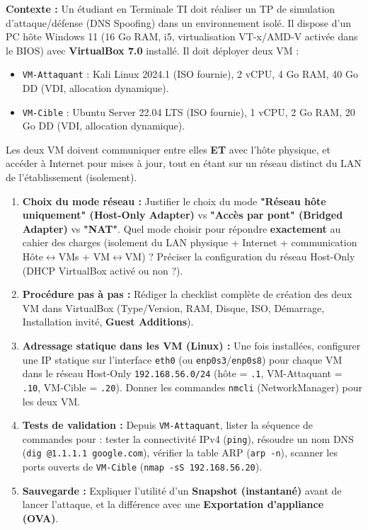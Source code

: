 \documentclass[11pt]{article}
\begin{document}
\begin{exoresolu}
\textbf{Contexte :} Un étudiant en Terminale TI doit réaliser un TP de simulation d'attaque/défense (DNS Spoofing) dans un environnement isolé. Il dispose d'un PC hôte Windows 11 (16 Go RAM, i5, virtualisation VT-x/AMD-V activée dans le BIOS) avec \textbf{VirtualBox 7.0} installé. Il doit déployer deux VM :
\begin{itemize}
    \item \texttt{VM-Attaquant} : Kali Linux 2024.1 (ISO fournie), 2 vCPU, 4 Go RAM, 40 Go DD (VDI, allocation dynamique).
    \item \texttt{VM-Cible} : Ubuntu Server 22.04 LTS (ISO fournie), 1 vCPU, 2 Go RAM, 20 Go DD (VDI, allocation dynamique).
\end{itemize}
Les deux VM doivent communiquer entre elles \textbf{ET} avec l'hôte physique, et accéder à Internet pour mises à jour, tout en étant sur un réseau distinct du LAN de l'établissement (isolement).

\begin{enumerate}
    \item \textbf{Choix du mode réseau :} Justifier le choix du mode \textbf{"Réseau hôte uniquement" (Host-Only Adapter)} vs \textbf{"Accès par pont" (Bridged Adapter)} vs \textbf{"NAT"}. Quel mode choisir pour répondre \textbf{exactement} au cahier des charges (isolement du LAN physique + Internet + communication Hôte$\leftrightarrow$VMs + VM$\leftrightarrow$VM) ? Préciser la configuration du réseau Host-Only (DHCP VirtualBox activé ou non ?).
    \item \textbf{Procédure pas à pas :} Rédiger la checklist complète de création des deux VM dans VirtualBox (Type/Version, RAM, Disque, ISO, Démarrage, Installation invité, \textbf{Guest Additions}).
    \item \textbf{Adressage statique dans les VM (Linux) :} Une fois installées, configurer une IP statique sur l'interface \texttt{eth0} (ou \texttt{enp0s3}/\texttt{enp0s8}) pour chaque VM dans le réseau Host-Only \texttt{192.168.56.0/24} (hôte = \texttt{.1}, VM-Attaquant = \texttt{.10}, VM-Cible = \texttt{.20}). Donner les commandes \texttt{nmcli} (NetworkManager) pour les deux VM.
    \item \textbf{Tests de validation :} Depuis \texttt{VM-Attaquant}, lister la séquence de commandes pour : tester la connectivité IPv4 (\texttt{ping}), résoudre un nom DNS (\texttt{dig @1.1.1.1 google.com}), vérifier la table ARP (\texttt{arp -n}), scanner les ports ouverts de \texttt{VM-Cible} (\texttt{nmap -sS 192.168.56.20}).
    \item \textbf{Sauvegarde :} Expliquer l'utilité d'un \textbf{Snapshot (instantané)} avant de lancer l'attaque, et la différence avec une \textbf{Exportation d'appliance (OVA)}.
\end{enumerate}
\end{exoresolu}
\end{document}
